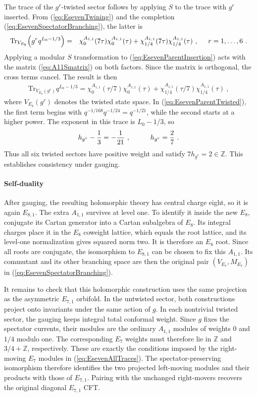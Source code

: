 \documentclass[12pt]{article}
\numberwithin{equation}{section}
\newcommand{\bea}{\begin{eqnarray}}
\newcommand{\eea}{\end{eqnarray}}
\def\ZZ{\mathbb{Z}}
\newcommand{\Tr}{\mathrm{Tr}}
\theoremstyle{remark}
\begin{document}
The trace of the $g^r$-twisted sector follows by applying $S$ to the trace with $g^r$ inserted. From (\ref{eq:EsevenTwining}) and the completion (\ref{eq:EsevenSpectatorBranching}), the latter is
\bea \label{eq:EsevenParentInsertion}
\Tr_{V_{E_8}}\!\left(g^r q^{L_0-1/3}\right)
&=&\chi^{A_{1,1}}_0(7\tau)\chi^{A_{1,1}}_0(\tau)+\chi^{A_{1,1}}_{1/4}(7\tau)\chi^{A_{1,1}}_{1/4}(\tau)~,
\hspace{0.2 in}r=1,\ldots,6~.
\eea
Applying a modular $S$ transformation to (\ref{eq:EsevenParentInsertion}) acts with the matrix (\ref{eq:A11Smatrix}) on both factors. Since the matrix is orthogonal, the cross terms cancel. The result is then
\bea \label{eq:EsevenParentTwisted}
\Tr_{V_{E_8}(g^r)}q^{L_0-1/3}=\chi^{A_{1,1}}_0(\tau/7)\chi^{A_{1,1}}_0(\tau)+\chi^{A_{1,1}}_{1/4}(\tau/7)\chi^{A_{1,1}}_{1/4}(\tau)~,
\eea
where $V_{E_8}(g^r)$ denotes the twisted state space. In (\ref{eq:EsevenParentTwisted}), the first term begins with $q^{-1/168}q^{-1/24}=q^{-1/21}$, while the second starts at a higher power. The exponent in this trace is $L_0-1/3$, so
\bea
h_{g^r}-{1\over3}=-{1\over21}~,
\hspace{0.4 in}h_{g^r}={2\over7}~.
\eea
Thus all six twisted sectors have positive weight and satisfy $7h_{g^r}=2\in\ZZ$. This establishes consistency under gauging. 

\paragraph{Self-duality}
After gauging, the resulting holomorphic theory has central charge eight, so it is again $E_{8,1}$. The extra $A_{1,1}$ survives at level one. To identify it inside the new $E_8$, conjugate its Cartan generator into a Cartan subalgebra of $E_8$. Its integral charges place it in the $E_8$ coweight lattice, which equals the root lattice, and its level-one normalization gives squared norm two. It is therefore an $E_8$ root. Since all roots are conjugate, the isomorphism to $E_{8,1}$ can be chosen to fix this $A_{1,1}$. Its commutant and its other branching space are then the original pair $(V_{E_7},M_{E_7})$ in (\ref{eq:EsevenSpectatorBranching}).

It remains to check that this holomorphic construction uses the same projection as the asymmetric $E_{7,1}$ orbifold. In the untwisted sector, both constructions project onto invariants under the same action of $g$. In each nontrivial twisted sector, the gauging keeps integral total conformal weight. Since $g$ fixes the spectator currents, their modules are the ordinary $A_{1,1}$ modules of weights $0$ and $1/4$ modulo one. The corresponding $E_7$ weights must therefore lie in $\ZZ$ and $3/4+\ZZ$, respectively. These are exactly the conditions imposed by the right-moving $E_7$ modules in (\ref{eq:EsevenAllTraces}). The spectator-preserving isomorphism therefore identifies the two projected left-moving modules and their products with those of $E_{7,1}$. Pairing with the unchanged right-movers recovers the original diagonal $E_{7,1}$ CFT.
\end{document}
